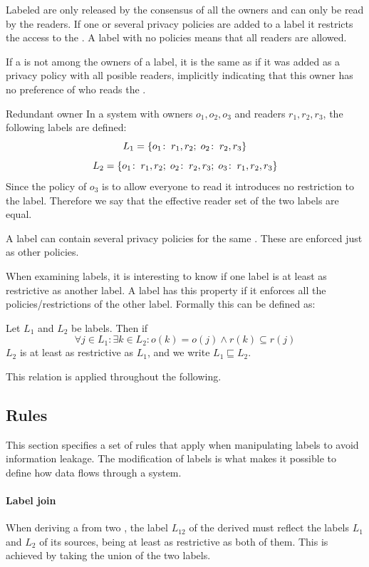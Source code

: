 Labeled \xvalues{} are only released by the consensus of all the owners and can only be read by the readers.
If one or several privacy policies are added to a label it restricts the access to the \xvalue{}.
A label with no policies  means that all readers are allowed.

If a \principal{} is not among the owners of a label, it is the same as if it was added as a privacy policy with all posible readers, implicitly indicating that this owner has no preference of who reads the \xvalue{}.

\begin{example}{Redundant owner}
In a system with owners $o_1, o_2, o_3$ and readers $r_1, r_2, r_3$, the following labels are defined:
$$L_1 = \{o_1\!:\;r_1,r_2;\; o_2\!:\;r_2, r_3\}$$
$$L_2 = \{o_1\!:\;r_1,r_2;\; o_2\!:\;r_2, r_3;\; o_3\!:\;r_1, r_2, r_3\}$$
Since the policy of $o_3$ is to allow everyone to read it introduces no restriction to the label.
Therefore we say that the effective reader set of the two labels are equal.
\end{example}

A label can contain several privacy policies for the same \principal{}.
These are enforced just as other policies.

When examining labels, it is interesting to know if one label is at least as restrictive as another label.
A label has this property if it enforces all the policies/restrictions of the other label.
Formally this can be defined as:

\begin{definition}\label{dlm:def:restrict}
  Let $L_1$ and $L_2$ be labels.
  Then if
  $$\forall j \in L_1 : \exists k \in L_2 : o(k) = o(j) \wedge r(k) \subseteq r(j)$$
  $L_2$ is at least as restrictive as $L_1$, and we write $L_1 \sqsubseteq L_2$.
\end{definition}

This relation is applied throughout the following.

\subsection{Rules}
This section specifies a set of rules that apply when manipulating labels to avoid information leakage.
The modification of labels is what makes it possible to define how data flows through a system.

\paragraph{Label join}
When deriving a \xvalue{} from two \xvalues{}, the label $L_{12}$ of the derived \xvalue{} must reflect the labels $L_1$ and $L_2$ of its sources, being at least as restrictive as both of them.
This is achieved by taking the union of the two labels.

